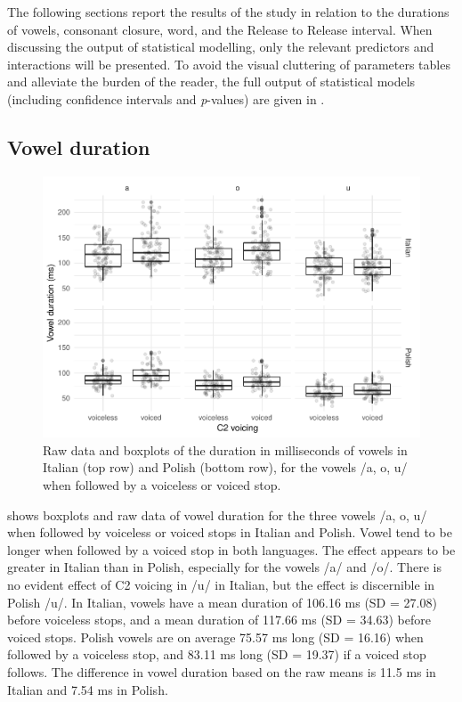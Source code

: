 \documentclass[12pt,]{article}
\begin{document}
The following sections report the results of the study in relation to
the durations of vowels, consonant closure, word, and the Release to
Release interval. When discussing the output of statistical modelling,
only the relevant predictors and interactions will be presented. To
avoid the visual cluttering of parameters tables and alleviate the
burden of the reader, the full output of statistical models (including
confidence intervals and \emph{p}-values) are given in .

\hypertarget{vowel-duration}{%
\subsection{Vowel duration}\label{vowel-duration}}

\label{s:vduration}

\begin{figure}
\includegraphics[width=\linewidth]{2018-relrel_files/figure-latex/Figure2} \caption{Raw data and boxplots of the duration in milliseconds of vowels in Italian (top row) and Polish (bottom row), for the vowels /a, o, u/ when followed by a voiceless or voiced stop.}\label{f:Figure2}
\end{figure}

 shows boxplots and raw data of vowel duration for the
three vowels /a, o, u/ when followed by voiceless or voiced stops in
Italian and Polish. Vowel tend to be longer when followed by a voiced
stop in both languages. The effect appears to be greater in Italian than
in Polish, especially for the vowels /a/ and /o/. There is no evident
effect of C2 voicing in /u/ in Italian, but the effect is discernible in
Polish /u/. In Italian, vowels have a mean duration of 106.16 ms (SD =
27.08) before voiceless stops, and a mean duration of 117.66 ms (SD =
34.63) before voiced stops. Polish vowels are on average 75.57 ms long
(SD = 16.16) when followed by a voiceless stop, and 83.11 ms long (SD =
19.37) if a voiced stop follows. The difference in vowel duration based
on the raw means is 11.5 ms in Italian and 7.54 ms in Polish.
\end{document}
